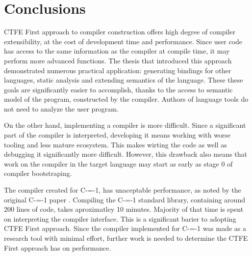 \section{Conclusions}

CTFE First approach to compiler construction offers high degree of compiler extensibility, at the cost of development time and performance.
Since user code has access to the same information as the compiler at compile time, it may perform more advanced functions.
The thesis that introduced this approach \cite{grabski2020} demonstrated numerous practical application: generating bindings for other languages, static analysis and extending semantics of the language.
These these goals are significantly easier to accomplish, thanks to the access to semantic model of the program, constructed by the compiler.
Authors of language tools do not need to analyze the user program.

On the other hand, implementing a compiler is more difficult.
Since a significant part of the compiler is interpreted, developing it means working with worse tooling and less mature ecosystem.
This makes wirting the code as well as debugging it significantly more difficult.
However, this drawback also means that work on the compiler in the target language may start as early as stage 0 of compiler bootstraping\cite{puntambekar:compiler_design, novillo2007gcc}.

The compiler created for C-=-1, has unaceptable performance, as noted by the original C-=-1 paper \cite{grabski2022compilation}.
Compiling the C-=-1 standard library, containing around 200 lines of code, takes aproximatley 10 minutes.
Majority of that time is spent on interpreting the compiler interface.
This is a significant barier to adopting CTFE First approach.
Since the compiler implemented for C-=-1 was made as a research tool with minimal effort, further work is needed to determine the CTFE First approach has on performance.
